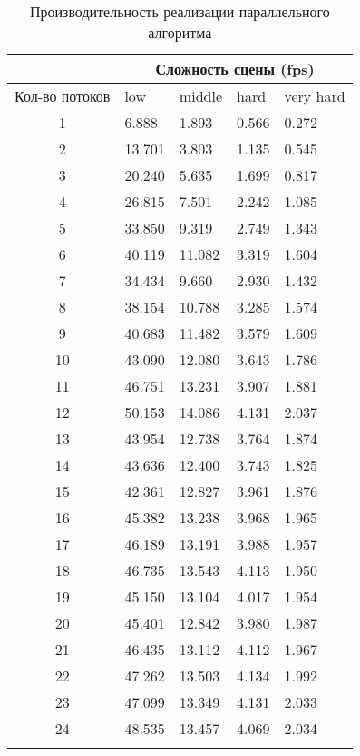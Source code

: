 \begin{center}
\begin{longtable}{|c|p{2cm}|p{2cm}|p{2cm}|p{2cm}|}
\hline & \multicolumn{4}{c|}{Сложность сцены (fps)} \\ 
\hline Кол-во потоков & low & middle & hard &  very hard\\ 
\hline 1 &  6.888 & 1.893 & 0.566 & 0.272 \\ 
\hline 2 &  13.701 & 3.803 & 1.135 & 0.545 \\ 
\hline 3 &  20.240 & 5.635 & 1.699 & 0.817 \\ 
\hline 4 &  26.815 & 7.501 & 2.242 & 1.085 \\ 
\hline 5 &  33.850 & 9.319 & 2.749 & 1.343 \\ 
\hline 6 &  40.119 & 11.082 & 3.319 & 1.604 \\ 
\hline 7 &  34.434 & 9.660 & 2.930 & 1.432 \\ 
\hline 8 &  38.154 & 10.788 & 3.285 & 1.574 \\ 
\hline 9 &  40.683 & 11.482 & 3.579 & 1.609 \\ 
\hline 10 &  43.090 & 12.080 & 3.643 & 1.786 \\ 
\hline 11 &  46.751 & 13.231 & 3.907 & 1.881 \\ 
\hline 12 &  50.153 & 14.086 & 4.131 & 2.037 \\ 
\hline 13 &  43.954 & 12.738 & 3.764 & 1.874 \\ 
\hline 14 &  43.636 & 12.400 & 3.743 & 1.825 \\ 
\hline 15 &  42.361 & 12.827 & 3.961 & 1.876 \\ 
\hline 16 &  45.382 & 13.238 & 3.968 & 1.965 \\ 
\hline 17 &  46.189 & 13.191 & 3.988 & 1.957 \\ 
\hline 18 &  46.735 & 13.543 & 4.113 & 1.950 \\ 
\hline 19 &  45.150 & 13.104 & 4.017 & 1.954 \\ 
\hline 20 &  45.401 & 12.842 & 3.980 & 1.987 \\ 
\hline 21 &  46.435 & 13.112 & 4.112 & 1.967 \\ 
\hline 22 &  47.262 & 13.503 & 4.134 & 1.992 \\ 
\hline 23 &  47.099 & 13.349 & 4.131 & 2.033 \\ 
\hline 24 &  48.535 & 13.457 & 4.069 & 2.034 \\ 
\hline
\caption{Производительность реализации параллельного алгоритма}\label{tab:perf_parallel_alg}\end{longtable}
\end{center}

